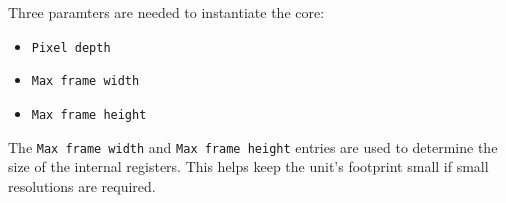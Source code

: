 \documentclass{article}
\begin{document}
Three paramters are needed to instantiate the core:

\begin{itemize}
    \item \texttt{Pixel depth}
    \item \texttt{Max frame width}
    \item \texttt{Max frame height}
\end{itemize}

The \texttt{Max frame width} and \texttt{Max frame height} entries are used to determine the size of the internal registers. This helps keep the unit's footprint small if small resolutions are required.
\end{document}
